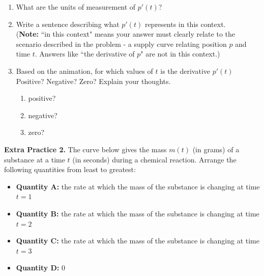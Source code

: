 \documentclass[10pt]{article}
\begin{document}
\begin{enumerate}

\item[(a)] What are the units of measurement of $p'(t)$?  

\item[(b)] Write a sentence describing what $p'(t)$ represents in this context.\\ 
({\bf Note:} ``in this context" means your answer must clearly relate to the scenario described in the problem - a supply curve relating position $p$ and time $t$. Answers like ``the derivative of $p$" are not in this context.)


\item[(c)] Based on the animation, for which values of $t$ is the derivative $p'(t)$ Positive? Negative? Zero? Explain your thoughts. 
  
    \begin{enumerate}
    \item[i.] positive?
    \item[ii.] negative?
    \item[iii.] zero?
    \end{enumerate}


\end{enumerate}



{\bf\color{blue}Extra Practice 2.}\reversemarginpar{} The curve below gives the mass $m(t)$ (in grams) of a substance at a time $t$ (in seconds) during a chemical reaction. Arrange the following quantities from least to greatest:
\begin{itemize}
\item {\bf Quantity A:} the rate at which the mass of the substance is changing at time $t=1$
\item {\bf Quantity B:} the rate at which the mass of the substance is changing at time $t=2$
\item {\bf Quantity C:} the rate at which the mass of the substance is changing at time $t=3$
\item {\bf Quantity D:} $0$
\end{itemize}
\end{document}
